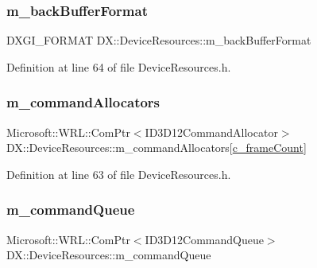 \subsubsection{\texorpdfstring{m\+\_\+back\+Buffer\+Format}{m\_backBufferFormat}}
{\footnotesize\ttfamily D\+X\+G\+I\+\_\+\+F\+O\+R\+M\+AT D\+X\+::\+Device\+Resources\+::m\+\_\+back\+Buffer\+Format\hspace{0.3cm}{\ttfamily [private]}}



Definition at line 64 of file Device\+Resources.\+h.

\mbox{\label{class_d_x_1_1_device_resources_afdaf82b33be14ee78ab6e540f4b63785}} 
\subsubsection{\texorpdfstring{m\+\_\+command\+Allocators}{m\_commandAllocators}}
{\footnotesize\ttfamily Microsoft\+::\+W\+R\+L\+::\+Com\+Ptr$<$I\+D3\+D12\+Command\+Allocator$>$ D\+X\+::\+Device\+Resources\+::m\+\_\+command\+Allocators\mbox{[}\mbox{\hyperlink{namespace_d_x_a13eecb6f150dc97fc5c7c8597377d0fb}{c\+\_\+frame\+Count}}\mbox{]}\hspace{0.3cm}{\ttfamily [private]}}



Definition at line 63 of file Device\+Resources.\+h.

\mbox{\label{class_d_x_1_1_device_resources_a0f0882523aa09b109f3a7bc05ff01f46}} 
\subsubsection{\texorpdfstring{m\+\_\+command\+Queue}{m\_commandQueue}}
{\footnotesize\ttfamily Microsoft\+::\+W\+R\+L\+::\+Com\+Ptr$<$I\+D3\+D12\+Command\+Queue$>$ D\+X\+::\+Device\+Resources\+::m\+\_\+command\+Queue\hspace{0.3cm}{\ttfamily [private]}}



